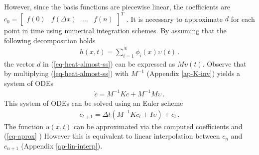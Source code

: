 However, since the basis functions are piecewise linear, the coefficients are \(c_0 = \begin{bmatrix}
f(0) & f(\Delta x) & ... & f(n)
\end{bmatrix}^T\)
\cite{Gustafsson2011g}.
It is necessary to approximate \(d\) for each point in time using numerical integration schemes.
By assuming that the following decomposition holds
\begin{gather}
h(x, t) = \sum_{i = 1}^{N} \phi_i(x) \upsilon(t) \,.
\end{gather}
the vector \(d\) in (\ref{eq-heat-almost-ss}) can be expressed as \(M\upsilon(t)\).
Observe that by multiplying (\ref{eq-heat-almost-ss}) with \(M^{-1}\) (Appendix \ref{ap-K-inv}) yields a system of ODEs
\begin{gather}
\dot{c} = M^{-1}Kc + M^{-1}M\upsilon \,. \label{almost-almost-ss}
\end{gather}
This system of ODEs can be solved using an Euler scheme
\begin{gather}
c_{t+1} = \Delta t (M^{-1}Kc_{t} + I\upsilon) + c_{t} \,. \label{fem-euler}
\end{gather}
 The function \(u(x,t)\) can be approximated via the computed coefficients and  (\ref{eq-aprox} )
However this is equivalent to linear interpolation between \(c_{n}\) and \(c_{n+1}\) (Appendix \ref{ap-lin-interp}).


